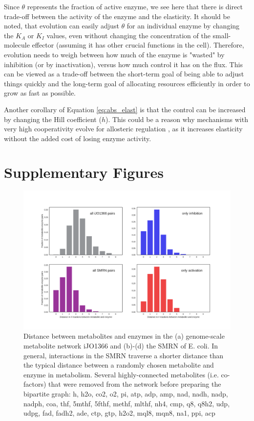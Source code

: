 \documentclass[12pt,a4paper]{article}
\begin{document}
Since $\theta$ represents the fraction of active enzyme, we see here that there is direct trade-off between the activity of the enzyme and the elasticity. It should be noted, that evolution can easily adjust $\theta$ for an individual enzyme by changing the $K_A$ or $K_I$ values, even without changing the concentration of the small-molecule effector (assuming it has other crucial functions in the cell). Therefore, evolution needs to weigh between how much of the enzyme is "wasted" by inhibition (or by inactivation), versus how much control it has on the flux. This can be viewed as a trade-off between the short-term goal of being able to adjust things quickly and the long-term goal of allocating resources efficiently in order to grow as fast as possible.

Another corollary of Equation \ref{eq:abs_elast} is that the control can be increased by changing the Hill coefficient ($h$). This could be a reason why mechanisms with very high cooperativity evolve for allosteric regulation \cite{Monod1965-dq}, as it increases elasticity without the added cost of losing enzyme activity.



\clearpage

\section{Supplementary Figures}

\begin{figure}[ht!]
\includegraphics[width=\textwidth]{../manuscript/figS1.pdf}
\caption{Distance between metabolites and enzymes in the (a) genome-scale metabolite network iJO1366 and (b)-(d) the SMRN of E. coli. In general, interactions in the SMRN traverse a shorter distance than the typical distance between a randomly chosen metabolite and enzyme in metabolism. Several highly-connected metabolites (i.e. co-factors) that were removed from the network before preparing the bipartite graph: h, h2o, co2, o2, pi, atp, adp, amp, nad, nadh, nadp, nadph, coa, thf, 5mthf, 5fthf, methf, mlthf, nh4, cmp, q8, q8h2, udp, udpg, fad, fadh2, ade, ctp, gtp, h2o2, mql8, mqn8, na1, ppi, acp
}
\end{figure}
\end{document}
